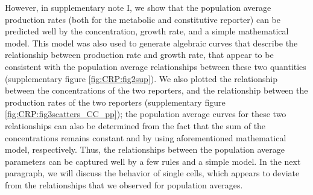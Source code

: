 {%
However, in supplementary note I, we show that the population average production rates (both for the metabolic and constitutive reporter) 
can be predicted well by 
the concentration, growth rate, 
and a simple mathematical model.
%
This model was also 
used to generate algebraic curves that describe
the relationship between production rate and growth rate, 
that appear to be consistent with the population average relationships between these two quantities (supplementary figure \ref{fig:CRP:fig2sup}).
%
We also plotted
the relationship between the concentrations of the two reporters,
and the relationship between the production rates of the two reporters (supplementary figure \ref{fig:CRP:fig3scatters_CC_pp});
the population average curves for these two relationships can also be determined from the 
fact that the sum of the concentrations remains constant and by using aforementioned mathematical model, respectively.
%
Thus,
the relationships between the population average parameters can be captured well by a few rules and a simple model.
%
In the next paragraph, we will discuss the behavior of single cells, which
appears to deviate from the relationships that we observed for population averages.
}





